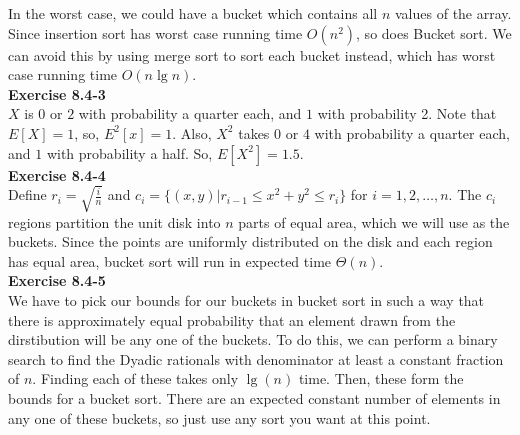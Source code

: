 \documentclass{article}
\begin{document}
In the worst case, we could have a bucket which contains all $n$ values of the array.   Since insertion sort has worst case running time $O(n^2)$, so does Bucket sort.  We can avoid this by using merge sort to sort each bucket instead, which has worst case running time $O(n \lg n)$.\\

\noindent\textbf{Exercise 8.4-3}\\

$X$ is $0$ or $2$ with probability a quarter each, and $1$ with probability 2. Note that $E[X]=1$, so, $E^2[x] = 1$. Also, $X^2$ takes $0$ or $4$ with probability a quarter each, and $1$ with probability a half. So, $E[X^2] = 1.5$.\\

\noindent\textbf{Exercise 8.4-4}\\

Define $r_i = \sqrt{\frac{i}{n}}$ and $c_i = \{(x,y) | r_{i-1} \leq x^2 + y^2 \leq r_i\}$ for $i = 1, 2, \ldots, n$.  The $c_i$ regions partition the unit disk into $n$ parts of equal area, which we will use as the buckets. Since the points are uniformly distributed on the disk and each region has equal area, bucket sort will run in expected time $\Theta(n)$. \\

\noindent\textbf{Exercise 8.4-5}\\

We have to pick our bounds for our buckets in bucket sort in such a way that there is approximately equal probability that an element drawn from the dirstibution will be any one of the buckets. To do this, we can perform a binary search to find the Dyadic rationals with denominator at least a constant fraction of $n$. Finding each of these takes only $\lg(n)$ time. Then, these form the bounds for a bucket sort. There are an expected constant number of elements in any one of these buckets, so just use any sort you want at this point.
\end{document}
